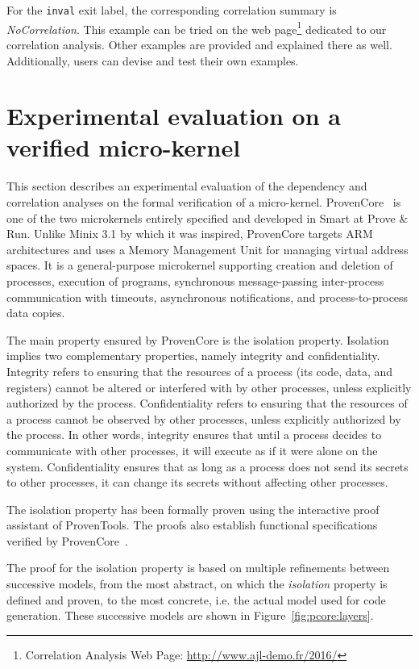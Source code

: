 \documentclass[11pt]{article}
\def\slang{\textsf{Smart}}
\def\prun{\textsf{Prove \& Run}}
\def\ptools{\textsf{ProvenTools}}
\def\pcore{\textsf{ProvenCore}}
\newcommand{\disp}[1]{\lstinline&#1&}
\begin{document}
For the \disp{inval} exit label, the corresponding correlation summary is 
\emph{NoCorrelation}. This example can be
tried on the web page\footnote{Correlation Analysis Web Page: \url{http://www.ajl-demo.fr/2016/}} 
dedicated to our correlation analysis. Other examples are provided and explained
there as well. Additionally, users can devise and test their own examples. 


\section{Experimental evaluation on a verified micro-kernel}

This section describes an experimental evaluation of the dependency
and correlation analyses on the formal verification of a
micro-kernel. 
{\pcore}~\cite{lescuyer15} is one of the two microkernels entirely 
specified and developed in {\slang} at {\prun}. Unlike Minix 3.1 by which 
it was inspired, {\pcore} targets 
ARM architectures and uses a Memory Management Unit for managing virtual 
address spaces. It is a general-purpose microkernel supporting creation 
and deletion of processes, execution of programs, synchronous message-passing 
inter-process communication with timeouts, asynchronous notifications, and 
process-to-process data copies. %

The main property ensured by {\pcore} is the isolation property. Isolation 
implies two complementary properties, namely integrity and 
confidentiality. Integrity refers to ensuring that the resources of a process
(its code, data, and registers) cannot be altered or interfered with by other
processes, unless explicitly authorized by the process. Confidentiality
refers to ensuring that the resources of a process cannot be observed
by other processes, unless explicitly authorized by the process. In other words,
integrity ensures that until a process decides to communicate with other 
processes, it will execute as if it were alone on the system. 
Confidentiality ensures that as long as a process does not send its secrets to 
other processes, it can change its secrets without affecting other processes.    

The isolation property has been formally proven using the interactive proof
assistant of {\ptools}. The proofs also establish functional specifications
verified by {\pcore}~\cite{lescuyer15}.

The proof for the isolation property is based on multiple refinements between 
successive models, from the most abstract, on which the \emph{isolation} 
property is defined and proven, to the most concrete, i.e. the actual model 
used for code generation. These successive models are shown in 
Figure~\ref{fig:pcore:layers}.
 
\end{document}
